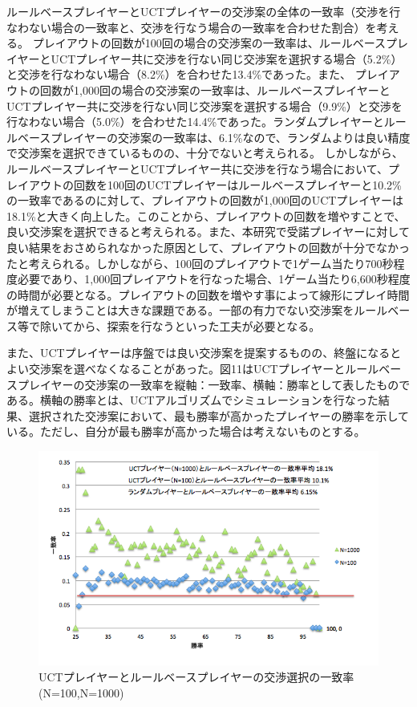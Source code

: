 \documentclass[a4, 10pt,dvipdfmx]{jsarticle}
\begin{document}
ルールベースプレイヤーとUCTプレイヤーの交渉案の全体の一致率（交渉を行なわない場合の一致率と、交渉を行なう場合の一致率を合わせた割合）を考える。
プレイアウトの回数が100回の場合の交渉案の一致率は、ルールベースプレイヤーとUCTプレイヤー共に交渉を行ない同じ交渉案を選択する場合（5.2\%）と交渉を行なわない場合（8.2\%）を合わせた13.4\%であった。また、
プレイアウトの回数が1,000回の場合の交渉案の一致率は、ルールベースプレイヤーとUCTプレイヤー共に交渉を行ない同じ交渉案を選択する場合（9.9\%）と交渉を行なわない場合（5.0\%）を合わせた14.4\%であった。ランダムプレイヤーとルールベースプレイヤーの交渉案の一致率は、6.1\%なので、ランダムよりは良い精度で交渉案を選択できているものの、十分でないと考えられる。
しかしながら、ルールベースプレイヤーとUCTプレイヤー共に交渉を行なう場合において、プレイアウトの回数を100回のUCTプレイヤーはルールベースプレイヤーと10.2\%の一致率であるのに対して、プレイアウトの回数が1,000回のUCTプレイヤーは18.1\%と大きく向上した。このことから、プレイアウトの回数を増やすことで、良い交渉案を選択できると考えられる。また、本研究で受諾プレイヤーに対して良い結果をおさめられなかった原因として、プレイアウトの回数が十分でなかったと考えられる。しかしながら、100回のプレイアウトで1ゲーム当たり700秒程度必要であり、1,000回プレイアウトを行なった場合、1ゲーム当たり6,600秒程度の時間が必要となる。プレイアウトの回数を増やす事によって線形にプレイ時間が増えてしまうことは大きな課題である。一部の有力でない交渉案をルールベース等で除いてから、探索を行なうといった工夫が必要となる。

また、UCTプレイヤーは序盤では良い交渉案を提案するものの、終盤になるとよい交渉案を選べなくなることがあった。図11はUCTプレイヤーとルールベースプレイヤーの交渉案の一致率を縦軸：一致率、横軸：勝率として表したものである。横軸の勝率とは、UCTアルゴリズムでシミュレーションを行なった結果、選択された交渉案において、最も勝率が高かったプレイヤーの勝率を示している。ただし、自分が最も勝率が高かった場合は考えないものとする。

\begin{figure}[b]
    \begin{center}
      \includegraphics[width=120mm]{img/match_100_1000.png}
    \end{center}
    \caption{UCTプレイヤーとルールベースプレイヤーの交渉選択の一致率(N=100,N=1000)}
    \label{alignment}
\end{figure}
\end{document}
